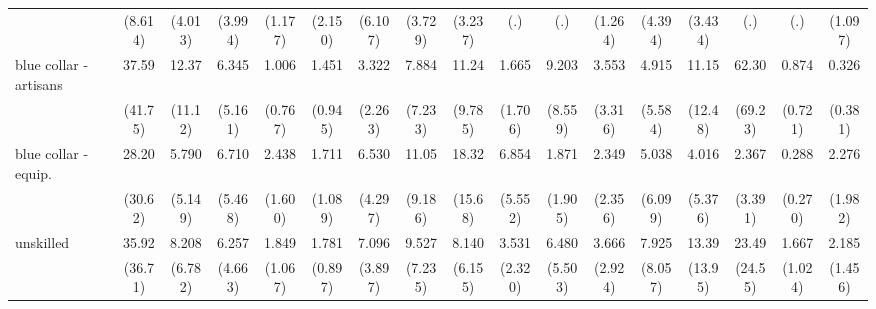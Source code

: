 {\begin{tabular}{l*{16}{c}}
                    &     (8.614)         &     (4.013)         &     (3.994)         &     (1.177)         &     (2.150)         &     (6.107)         &     (3.729)         &     (3.237)         &         (.)         &         (.)         &     (1.264)         &     (4.394)         &     (3.434)         &         (.)         &         (.)         &     (1.097)         \\
[1em]
blue collar - artisans&       37.59\sym{**} &       12.37\sym{**} &       6.345\sym{*}  &       1.006         &       1.451         &       3.322         &       7.884\sym{*}  &       11.24\sym{**} &       1.665         &       9.203\sym{*}  &       3.553         &       4.915         &       11.15\sym{*}  &       62.30\sym{***}&       0.874         &       0.326         \\
                    &     (41.75)         &     (11.12)         &     (5.161)         &     (0.767)         &     (0.945)         &     (2.263)         &     (7.233)         &     (9.785)         &     (1.706)         &     (8.559)         &     (3.316)         &     (5.584)         &     (12.48)         &     (69.23)         &     (0.721)         &     (0.381)         \\
[1em]
blue collar - equip.&       28.20\sym{**} &       5.790\sym{*}  &       6.710\sym{*}  &       2.438         &       1.711         &       6.530\sym{**} &       11.05\sym{**} &       18.32\sym{***}&       6.854\sym{*}  &       1.871         &       2.349         &       5.038         &       4.016         &       2.367         &       0.288         &       2.276         \\
                    &     (30.62)         &     (5.149)         &     (5.468)         &     (1.600)         &     (1.089)         &     (4.297)         &     (9.186)         &     (15.68)         &     (5.552)         &     (1.905)         &     (2.356)         &     (6.099)         &     (5.376)         &     (3.391)         &     (0.270)         &     (1.982)         \\
[1em]
unskilled           &       35.92\sym{***}&       8.208\sym{*}  &       6.257\sym{*}  &       1.849         &       1.781         &       7.096\sym{***}&       9.527\sym{**} &       8.140\sym{**} &       3.531         &       6.480\sym{*}  &       3.666         &       7.925\sym{*}  &       13.39\sym{*}  &       23.49\sym{**} &       1.667         &       2.185         \\
                    &     (36.71)         &     (6.782)         &     (4.663)         &     (1.067)         &     (0.897)         &     (3.897)         &     (7.235)         &     (6.155)         &     (2.320)         &     (5.503)         &     (2.924)         &     (8.057)         &     (13.95)         &     (24.55)         &     (1.024)         &     (1.456)         \\

\end{tabular}}
